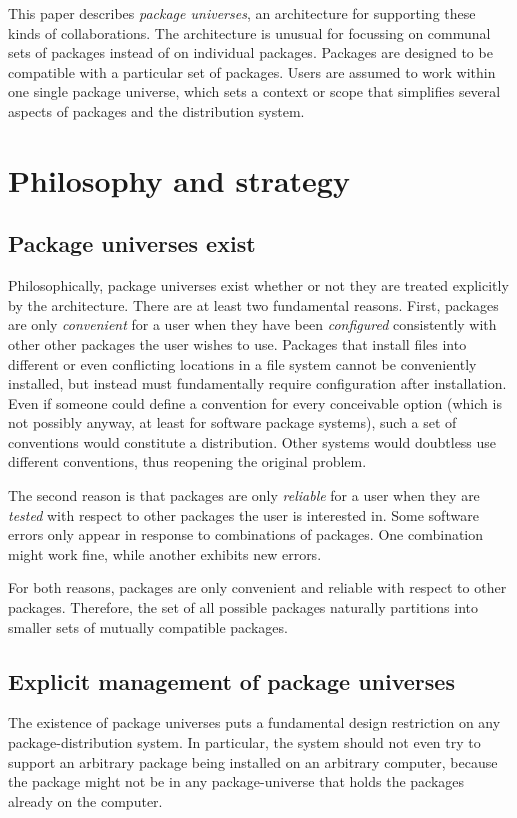 \documentclass{article}
\begin{document}
This paper describes \emph{package universes}, an architecture for
supporting these kinds of collaborations.  The architecture is unusual
for focussing on communal sets of packages instead of on individual
packages.  Packages are designed to be compatible with a particular
set of  packages.  Users are assumed to work within one single
package universe, which sets a context or scope that simplifies
several aspects of packages and the distribution system.



\section{Philosophy and strategy}

\subsection{Package universes exist}
Philosophically, package universes exist whether or not they are
treated explicitly by the architecture.  There are at least two
fundamental reasons.  First, packages are only \emph{convenient} for a
user when they have been \emph{configured} consistently with other
other packages the user wishes to use.  Packages that install files
into different or even conflicting locations in a file system cannot be
conveniently installed, but instead must fundamentally require
configuration after installation.  Even if someone could define a
convention for every conceivable option (which is not possibly anyway,
at least for software package systems), such a set of conventions
would constitute a distribution.  Other systems would doubtless use
different conventions, thus reopening the original problem.

The second reason is that packages are only \emph{reliable} for a user
when they are \emph{tested} with respect to other packages the user is
interested in.  Some software errors only appear in response to
combinations of packages.  One combination might work fine, while
another exhibits new errors.

For both reasons, packages are only convenient and reliable with
respect to other packages.  Therefore, the set of all possible
packages naturally partitions into smaller sets of mutually compatible
packages.


\subsection{Explicit management of package universes}
The existence of package universes puts a fundamental design
restriction on any package-distribution system.  In particular, the
system should not even try to support an arbitrary package being
installed on an arbitrary computer, because the package might not be
in any package-universe that holds the packages already on the
computer.
\end{document}
